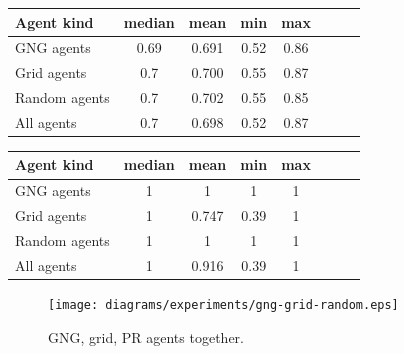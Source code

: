 \begin{center}
  \begin{tabular}{l*{6}{c}r}
  Agent kind        & median & mean & min & max \\
  \hline
  GNG agents        & 0.69 & 0.691 & 0.52 & 0.86  \\
  Grid agents       & 0.7 & 0.700 & 0.55 & 0.87  \\   
  Random agents     & 0.7 & 0.702 & 0.55 & 0.85  \\
  All agents        & 0.7 & 0.698 & 0.52 & 0.87  \\ 
  \end{tabular}                                
\end{center}

\begin{center} 
  \begin{tabular}{l*{6}{c}r}
  Agent kind        & median & mean & min & max \\
  \hline
  GNG agents        & 1 & 1 & 1 & 1  \\
  Grid agents       & 1 & 0.747 & 0.39 & 1  \\   
  Random agents     & 1 & 1 & 1 & 1  \\
  All agents        & 1 & 0.916 & 0.39 & 1  \\ 
  \end{tabular}                                        
\end{center}



\begin{figure}
  \centering                                
  \texttt{[image: diagrams/experiments/gng-grid-random.eps]}    
  \caption{GNG, grid, PR agents together.}
  \label{experiments:gng-grid-pr-random}
\end{figure} 
                                       
